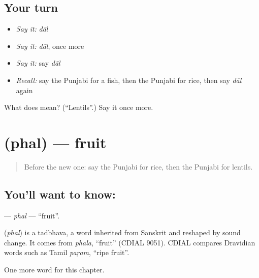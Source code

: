 \subsection*{Your turn}
\begin{itemize}
\raggedright
  \item \emph{Say it:} \emph{dāl}
  \item \emph{Say it:} \emph{dāl}, once more
  \item \emph{Say it:} say \emph{dāl}
  \item \emph{Recall:} say the Punjabi for a fish, then the Punjabi for rice, then say \emph{dāl} again
\end{itemize}

\begin{tcolorbox}[breakable,colback=teal!4,colframe=teal!35!black,title={Before you move on}]
What does  mean? (\textquotedblleft{}Lentils\textquotedblright{}.) Say it once more.
\end{tcolorbox}
\section[\texorpdfstring{\pa{ਫਲ} (phal)}{ਫਲ (phal)}]{ (phal) — fruit}

\label{lesson:PA-C64-phal}



\begin{quote}
Before the new one: say the Punjabi for rice, then the Punjabi for lentils.
\end{quote}

\subsection*{You'll want to know: }
\textbf{} — \emph{phal} — \textquotedblleft{}fruit\textquotedblright{}.

\begin{cousinweb}
\textbf{} (\emph{phal}) is a tadbhava, a word inherited from Sanskrit and reshaped by sound change. It comes from \emph{phala}, \textquotedblleft{}fruit\textquotedblright{} (CDIAL 9051). CDIAL compares Dravidian words such as Tamil \emph{paṛam}, \textquotedblleft{}ripe fruit\textquotedblright{}.
\end{cousinweb}

\begin{grammarlens}[title={What you've built}]
One more word for this chapter.
\end{grammarlens}


